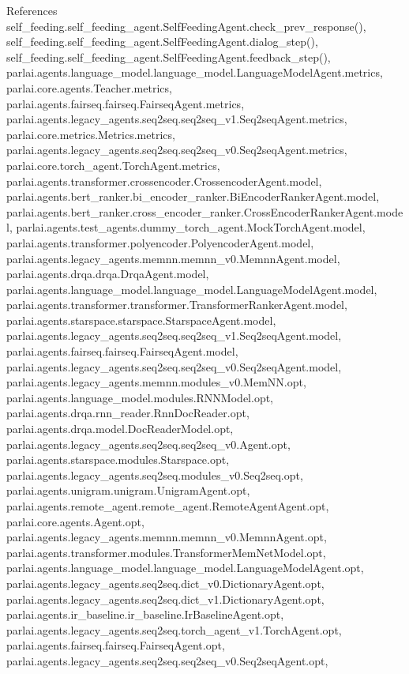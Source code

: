References self\+\_\+feeding.\+self\+\_\+feeding\+\_\+agent.\+Self\+Feeding\+Agent.\+check\+\_\+prev\+\_\+response(), self\+\_\+feeding.\+self\+\_\+feeding\+\_\+agent.\+Self\+Feeding\+Agent.\+dialog\+\_\+step(), self\+\_\+feeding.\+self\+\_\+feeding\+\_\+agent.\+Self\+Feeding\+Agent.\+feedback\+\_\+step(), parlai.\+agents.\+language\+\_\+model.\+language\+\_\+model.\+Language\+Model\+Agent.\+metrics, parlai.\+core.\+agents.\+Teacher.\+metrics, parlai.\+agents.\+fairseq.\+fairseq.\+Fairseq\+Agent.\+metrics, parlai.\+agents.\+legacy\+\_\+agents.\+seq2seq.\+seq2seq\+\_\+v1.\+Seq2seq\+Agent.\+metrics, parlai.\+core.\+metrics.\+Metrics.\+metrics, parlai.\+agents.\+legacy\+\_\+agents.\+seq2seq.\+seq2seq\+\_\+v0.\+Seq2seq\+Agent.\+metrics, parlai.\+core.\+torch\+\_\+agent.\+Torch\+Agent.\+metrics, parlai.\+agents.\+transformer.\+crossencoder.\+Crossencoder\+Agent.\+model, parlai.\+agents.\+bert\+\_\+ranker.\+bi\+\_\+encoder\+\_\+ranker.\+Bi\+Encoder\+Ranker\+Agent.\+model, parlai.\+agents.\+bert\+\_\+ranker.\+cross\+\_\+encoder\+\_\+ranker.\+Cross\+Encoder\+Ranker\+Agent.\+model, parlai.\+agents.\+test\+\_\+agents.\+dummy\+\_\+torch\+\_\+agent.\+Mock\+Torch\+Agent.\+model, parlai.\+agents.\+transformer.\+polyencoder.\+Polyencoder\+Agent.\+model, parlai.\+agents.\+legacy\+\_\+agents.\+memnn.\+memnn\+\_\+v0.\+Memnn\+Agent.\+model, parlai.\+agents.\+drqa.\+drqa.\+Drqa\+Agent.\+model, parlai.\+agents.\+language\+\_\+model.\+language\+\_\+model.\+Language\+Model\+Agent.\+model, parlai.\+agents.\+transformer.\+transformer.\+Transformer\+Ranker\+Agent.\+model, parlai.\+agents.\+starspace.\+starspace.\+Starspace\+Agent.\+model, parlai.\+agents.\+legacy\+\_\+agents.\+seq2seq.\+seq2seq\+\_\+v1.\+Seq2seq\+Agent.\+model, parlai.\+agents.\+fairseq.\+fairseq.\+Fairseq\+Agent.\+model, parlai.\+agents.\+legacy\+\_\+agents.\+seq2seq.\+seq2seq\+\_\+v0.\+Seq2seq\+Agent.\+model, parlai.\+agents.\+legacy\+\_\+agents.\+memnn.\+modules\+\_\+v0.\+Mem\+N\+N.\+opt, parlai.\+agents.\+language\+\_\+model.\+modules.\+R\+N\+N\+Model.\+opt, parlai.\+agents.\+drqa.\+rnn\+\_\+reader.\+Rnn\+Doc\+Reader.\+opt, parlai.\+agents.\+drqa.\+model.\+Doc\+Reader\+Model.\+opt, parlai.\+agents.\+legacy\+\_\+agents.\+seq2seq.\+seq2seq\+\_\+v0.\+Agent.\+opt, parlai.\+agents.\+starspace.\+modules.\+Starspace.\+opt, parlai.\+agents.\+legacy\+\_\+agents.\+seq2seq.\+modules\+\_\+v0.\+Seq2seq.\+opt, parlai.\+agents.\+unigram.\+unigram.\+Unigram\+Agent.\+opt, parlai.\+agents.\+remote\+\_\+agent.\+remote\+\_\+agent.\+Remote\+Agent\+Agent.\+opt, parlai.\+core.\+agents.\+Agent.\+opt, parlai.\+agents.\+legacy\+\_\+agents.\+memnn.\+memnn\+\_\+v0.\+Memnn\+Agent.\+opt, parlai.\+agents.\+transformer.\+modules.\+Transformer\+Mem\+Net\+Model.\+opt, parlai.\+agents.\+language\+\_\+model.\+language\+\_\+model.\+Language\+Model\+Agent.\+opt, parlai.\+agents.\+legacy\+\_\+agents.\+seq2seq.\+dict\+\_\+v0.\+Dictionary\+Agent.\+opt, parlai.\+agents.\+legacy\+\_\+agents.\+seq2seq.\+dict\+\_\+v1.\+Dictionary\+Agent.\+opt, parlai.\+agents.\+ir\+\_\+baseline.\+ir\+\_\+baseline.\+Ir\+Baseline\+Agent.\+opt, parlai.\+agents.\+legacy\+\_\+agents.\+seq2seq.\+torch\+\_\+agent\+\_\+v1.\+Torch\+Agent.\+opt, parlai.\+agents.\+fairseq.\+fairseq.\+Fairseq\+Agent.\+opt, parlai.\+agents.\+legacy\+\_\+agents.\+seq2seq.\+seq2seq\+\_\+v0.\+Seq2seq\+Agent.\+opt, 